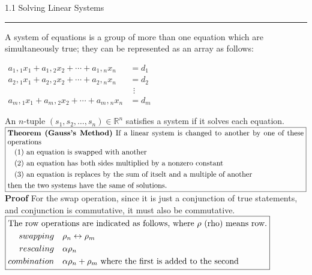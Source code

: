 \documentclass{article}
\begin{document}
1.1 Solving Linear Systems
\hrule

\vspace{10pt}

A system of equations is a group of more than one equation which are simultaneously true; they can be represented as an array as follows:\\

\begin{center}
$\boxed{\begin{aligned}
a_1,{}_1x_1+a_1,{}_2x_2+\cdots+a_1,{}_nx_n&=d_1\\
a_2,{}_1x_1+a_2,{}_2x_2+\cdots+a_2,{}_nx_n&=d_2\\
&\hspace{5pt} \vdots\\
a_m,{}_1x_1+a_m,{}_2x_2+\cdots+a_m,{}_nx_n&=d_m
\end{aligned}}$
\end{center}

An $n$-tuple $(s_1,s_2,\ldots,s_n)\in\mathbb{R}^n$ satisfies a system if it solves each equation.\\

$\boxed{\begin{aligned}
\multicolumn{1}{p{5.5in}}{{\bf{}Theorem (Gauss's Method)} If a linear system is changed to another by one of these operations}\\
\multicolumn{1}{l}{\phantom{M}(1) an equation is swapped with another}\\
\multicolumn{1}{l}{\phantom{M}(2) an equation has both sides multiplied by a nonzero constant}\\
\multicolumn{1}{l}{\phantom{M}(3) an equation is replaces by the sum of itselt and a multiple of another}\\
\multicolumn{1}{p{5.5in}}{then the two systems have the same of solutions.}
\end{aligned}}$\\

{\bf{}Proof} For the swap operation, since it is just a conjunction of true statements, and conjunction is commutative, it must also be commutative.\\

$\boxed{\begin{aligned}
\multicolumn{2}{l}{The row operations are indicated as follows, where $\rho$ (rho) means row.}\\
swapping&\quad\rho_n\leftrightarrow\rho_m\\
rescaling&\quad\alpha\rho_n\\
combination&\quad\alpha\rho_n+\rho_m\mbox{ where the first is added to the second}\\
\end{aligned}}$\\
\end{document}
